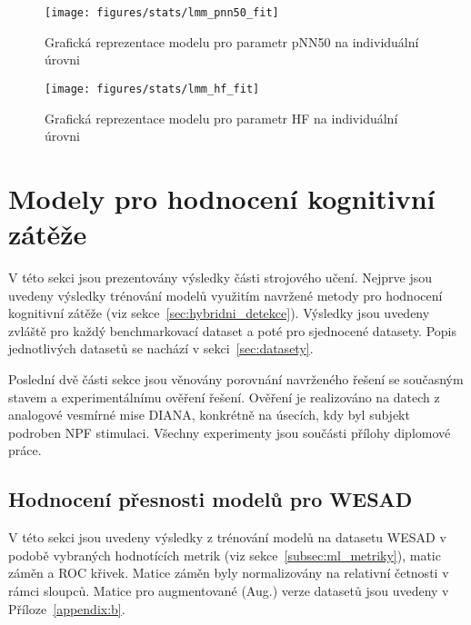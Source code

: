 \begin{figure}[!htb]
    \begin{center}
        \texttt{[image: figures/stats/lmm\_pnn50\_fit]}
        \caption{Grafická reprezentace modelu pro parametr pNN50 na individuální úrovni}
        \label{fig:results_lmm_fit3}
    \end{center}
\end{figure}

\begin{figure}[!htb]
    \begin{center}
        \texttt{[image: figures/stats/lmm\_hf\_fit]}
        \caption{Grafická reprezentace modelu pro parametr HF na individuální úrovni}
        \label{fig:results_lmm_fit4}
    \end{center}
\end{figure}



\section{Modely pro hodnocení kognitivní zátěže}
\label{sec:vysledky_detekce_cl}
V této sekci jsou prezentovány výsledky části strojového učení. Nejprve jsou
uvedeny výsledky trénování modelů využitím navržené metody pro hodnocení
kognitivní zátěže (viz sekce~\ref{sec:hybridni_detekce}). Výsledky jsou uvedeny
zvláště pro každý benchmarkovací dataset a poté pro sjednocené datasety. Popis
jednotlivých datasetů se nachází v sekci~\ref{sec:datasety}.

Poslední dvě části sekce jsou věnovány porovnání navrženého řešení se současným
stavem a experimentálnímu ověření řešení. Ověření je realizováno na datech z
analogové vesmírné mise DIANA, konkrétně na úsecích, kdy byl subjekt podroben
\gls{NPF} stimulaci. Všechny experimenty jsou součásti přílohy diplomové práce.

\subsection{Hodnocení přesnosti modelů pro WESAD}
\label{subsec:wesad_models}
V této sekci jsou uvedeny výsledky z trénování modelů na datasetu WESAD v podobě
vybraných hodnotících metrik (viz sekce~\ref{subsec:ml_metriky}), matic záměn a
ROC křivek. Matice záměn byly normalizovány na relativní četnosti v rámci
sloupců. Matice pro augmentované (Aug.) verze datasetů jsou uvedeny v
Příloze~\ref{appendix:b}.

